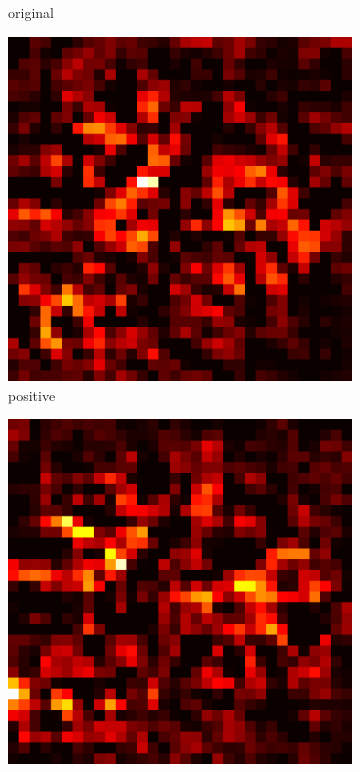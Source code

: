 \documentclass[preprint,12pt]{elsarticle}
\begin{document}
\begin{figure}
\begin{subfigure}{0.14\linewidth}
        \caption{original}
    \end{subfigure}
    \hfill
    \begin{subfigure}{0.14\textwidth}
        \centering
        \includegraphics[width=\linewidth]{../visualizations/examples/cifar10/cnn/positive_saliency_map/7.png}
        \caption{positive}
    \end{subfigure}
    \hfill
    \begin{subfigure}{0.14\textwidth}
        \centering
        \includegraphics[width=\linewidth]{../visualizations/examples/cifar10/cnn/negative_saliency_map/7.png}

\end{subfigure}
\end{figure}
\end{document}
